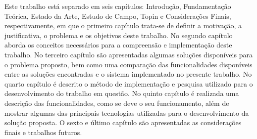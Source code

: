 Este trabalho está separado em seis capítulos: Introdução, Fundamentação Teórica, Estado da Arte, Estudo de Campo,
Topin e Considerações Finais, respectivamente, em que o primeiro capítulo trata-se de definir a motivação, a
justificativa, o problema e os objetivos deste trabalho. No segundo capítulo aborda os conceitos necessários
para a compreensão e implementação deste trabalho. No terceiro capítulo são apresentadas algumas soluções
disponíveis para o problema proposto, bem como uma comparação das funcionalidades disponíveis entre as soluções
encontradas e o sistema implementado no presente trabalho. No quarto capítulo é descrito o método de implementação
e pesquisa utilizado para o desenvolvimento do trabalho em questão. No quinto capítulo é realizada uma descrição
das funcionalidades, como se deve o seu funcionamento, além de mostrar algumas das principais tecnologias
utilizadas para o desenvolvimento da solução proposta. O sexto e último capítulo são apresentadas as considerações
finais e trabalhos futuros.
